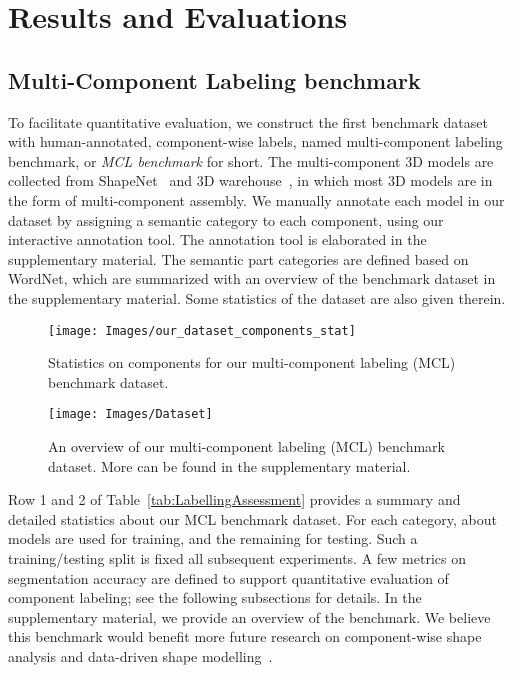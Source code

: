 \documentclass[acmtog]{acmart}
\newcommand{\kx}[1]{{\color{black}#1}}
\newcommand{\new}[1]{{\color{black}#1}}
\begin{document}
 
\section{Results and Evaluations}
\label{sec:result}


\subsection{Multi-Component Labeling benchmark}
\label{subsec:benchmark}
To facilitate quantitative evaluation, we construct the first benchmark dataset with
human-annotated, component-wise labels, named multi-component labeling benchmark, or \emph{MCL benchmark} for short.
The multi-component 3D models are collected from ShapeNet~\cite{ShapeNet2015} and 3D warehouse~\cite{Tri3Dwarehouse},
in which most 3D models are in the form of multi-component assembly.
We manually annotate each model in our dataset
by assigning a semantic category to each component, using our interactive annotation tool.
\kx{The annotation tool is elaborated in the supplementary material.
The semantic part categories are defined based on WordNet, which are summarized with an overview of the benchmark dataset in the supplementary material. Some statistics of the dataset are also given therein.}

\begin{figure}[ht]
  \centering
  \texttt{[image: Images/our\_dataset\_components\_stat]}
  \caption{\new{Statistics on components for our multi-component labeling (MCL) benchmark dataset.}}
  \label{fig:mclstats}
\end{figure}


\begin{figure*}[ht]
  \centering
  \texttt{[image: Images/Dataset]}
  \caption{\new{An overview of our multi-component labeling (MCL) benchmark dataset. More can be found in the supplementary material.}}
  \label{fig:Dataset}
\end{figure*}
\fi

Row 1 and 2 of Table~\ref{tab:LabellingAssessment} provides a summary and detailed statistics
about our MCL benchmark dataset.
For each category, about  models are used for training,
and the remaining for testing.
Such a training/testing split is fixed all subsequent experiments.
A few metrics on segmentation accuracy are defined to support quantitative evaluation
of component labeling; see the following subsections for details.
In the supplementary material, we provide an overview of the benchmark.
We believe this benchmark would benefit more future research
on component-wise shape analysis and data-driven shape modelling~\cite{Sung2017,li_sig17}.
\end{document}
